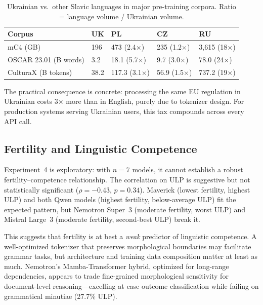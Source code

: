 \documentclass[11pt,a4paper]{article}
\begin{document}
\begin{table}[t]
\centering
\caption{Ukrainian vs.\ other Slavic languages in major pre-training corpora. Ratio = language volume / Ukrainian volume.}
\label{tab:pretraining}
\begin{tabular}{lR{1.4cm}R{1.0cm}R{1.4cm}R{1.0cm}}
\toprule
\textbf{Corpus} & \textbf{UK} & \textbf{PL} & \textbf{CZ} & \textbf{RU} \\
\midrule
mC4 (GB)       & 196   & 473 (2.4$\times$)  & 235 (1.2$\times$)  & 3{,}615 (18$\times$) \\
OSCAR 23.01 (B words) & 3.2  & 18.1 (5.7$\times$) & 9.7 (3.0$\times$)  & 78.0 (24$\times$) \\
CulturaX (B tokens)   & 38.2 & 117.3 (3.1$\times$) & 56.9 (1.5$\times$) & 737.2 (19$\times$) \\
\bottomrule
\end{tabular}
\end{table}

The practical consequence is concrete: processing the same EU regulation in Ukrainian costs 3$\times$ more than in English, purely due to tokenizer design. For production systems serving Ukrainian users, this tax compounds across every API call.

\subsection{Fertility and Linguistic Competence}

Experiment~4 is exploratory: with $n = 7$ models, it cannot establish a robust fertility--competence relationship. The correlation on ULP is suggestive but not statistically significant ($\rho = -0.43$, $p = 0.34$). Maverick (lowest fertility, highest ULP) and both Qwen models (highest fertility, below-average ULP) fit the expected pattern, but Nemotron Super~3 (moderate fertility, worst ULP) and Mistral Large~3 (moderate fertility, second-best ULP) break it.

This suggests that fertility is at best a \emph{weak} predictor of linguistic competence. A well-optimized tokenizer that preserves morphological boundaries may facilitate grammar tasks, but architecture and training data composition matter at least as much. Nemotron's Mamba-Transformer hybrid, optimized for long-range dependencies, appears to trade fine-grained morphological sensitivity for document-level reasoning---excelling at case outcome classification \citep[96.0\%]{ovcharov2026tokenizer} while failing on grammatical minutiae (27.7\% ULP).
\end{document}
